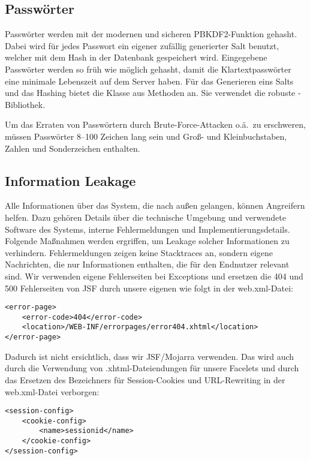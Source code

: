 \subsection{Passwörter}\label{subsec:passwords}
Passwörter werden mit der modernen und sicheren PBKDF2-Funktion gehasht.
Dabei wird für jedes Passwort ein eigener zufällig generierter Salt benutzt, welcher mit dem Hash in der Datenbank gespeichert wird.
Eingegebene Passwörter werden so früh wie möglich gehasht, damit die Klartextpasswörter eine minimale Lebenszeit auf dem Server haben.
Für das Generieren eins Salts und das Hashing bietet die Klasse  aus 
Methoden an.
Sie verwendet die robuste -Bibliothek.

Um das Erraten von Passwörtern durch Brute-Force-Attacken o.ä.\ zu erschweren, müssen Passwörter 8--100 Zeichen lang sein und Groß- und Kleinbuchstaben, Zahlen und Sonderzeichen enthalten.

\subsection{Information Leakage}\label{subsec:information-leakage}
Alle Informationen über das System, die nach außen gelangen, können Angreifern helfen.
Dazu gehören Details über die technische Umgebung und verwendete Software des Systems, interne Fehlermeldungen und Implementierungsdetails.
Folgende Maßnahmen werden ergriffen, um Leakage solcher Informationen zu verhindern.
Fehlermeldungen zeigen keine Stacktraces an, sondern eigene Nachrichten, die nur Informationen enthalten, die für den Endnutzer relevant sind.
Wir verwenden eigene Fehlerseiten bei Exceptions und ersetzen die 404 und 500 Fehlerseiten von JSF durch unsere eigenen wie folgt in der web.xml-Datei:
    {\small
\begin{lstlisting}
<error-page>
    <error-code>404</error-code>
    <location>/WEB-INF/errorpages/error404.xhtml</location>
</error-page>
\end{lstlisting}
}
Dadurch ist nicht ersichtlich, dass wir JSF/Mojarra verwenden.
Das wird auch durch die Verwendung von .xhtml-Dateiendungen für unsere Facelets und durch das Ersetzen des Bezeichners  für Session-Cookies und URL-Rewriting in der web.xml-Datei verborgen:

\begin{minipage}{\linewidth}
    {\small
\begin{lstlisting}
<session-config>
    <cookie-config>
        <name>sessionid</name>
    </cookie-config>
</session-config>
\end{lstlisting}
}
\end{minipage}


